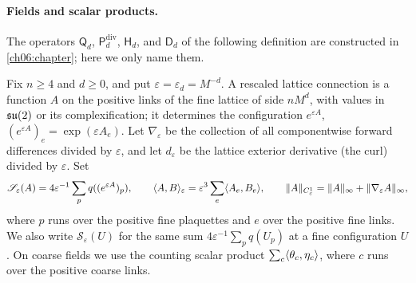 \paragraph{Fields and scalar products.}
The operators $\mathsf Q_d$, $\mathsf P_d^{\mathrm{div}}$, $\mathsf H_d$, and $\mathsf D_d$ of the following definition are constructed in \cref{ch06:chapter}; here we only name them.

\begin{definition}\label{ch07:def:physical-classical-data}
Fix $n\ge4$ and $d\ge0$, and put $\varepsilon=\varepsilon_d=M^{-d}$. A rescaled lattice connection is a function $A$ on the positive links of the fine lattice of side $nM^d$, with values in $\mathfrak{su}(2)$ or its complexification; it determines the configuration $e^{\varepsilon A}$, $(e^{\varepsilon A})_e=\exp(\varepsilon A_e)$. Let $\nabla_\varepsilon$ be the collection of all componentwise forward differences divided by $\varepsilon$, and let $d_\varepsilon$ be the lattice exterior derivative (the curl) divided by $\varepsilon$. Set
\[
 \mathscr S_\varepsilon(A)=4\varepsilon^{-1}\sum_pq((e^{\varepsilon A})_p),\qquad
 \langle A,B\rangle_\varepsilon=\varepsilon^3\sum_e\langle A_e,B_e\rangle,\qquad
 \lVert A\rVert_{C^1_\varepsilon}=\lVert A\rVert_\infty+\lVert \nabla_\varepsilon A\rVert_\infty,
\]
where $p$ runs over the positive fine plaquettes and $e$ over the positive fine links. We also write $\mathscr S_\varepsilon(U)$ for the same sum $4\varepsilon^{-1}\sum_pq(U_p)$ at a fine configuration $U$. On coarse fields we use the counting scalar product $\sum_c\langle \theta_c,\eta_c\rangle$, where $c$ runs over the positive coarse links.


\end{definition}
